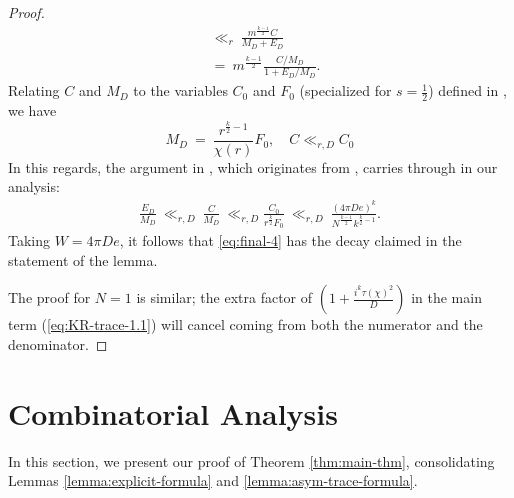\documentclass[12pt, reqno,oneside]{amsart}
\theoremstyle{plain}
\theoremstyle{definition}
\theoremstyle{remark}
\theoremstyle{plain}
\numberwithin{equation}{section}
\begin{document}
\begin{proof}
\begin{align}
\nonumber
&\ll_r \ \frac{m^{\frac{k-1}{2}}C}{M_D+E_D}\\
\label{eq:final-4}
&= \ m^{\frac{k-1}{2}}\frac{C/M_D}{1+E_D/M_D}.
\end{align}
Relating $C$ and $M_D$ to the variables $C_0$ and $F_0$ (specialized for $s=\frac{1}{2}$) defined in \cite[160-161]{KR18}, we have
\begin{equation}
M_D \ = \ \frac{r^{\frac{k}{2}-1}}{\chi(r)}F_0, \quad C \ll_{r,D} C_0
\end{equation}
In this regards, the argument 
in \cite[161]{KR18}, which originates from \cite[Section 9]{JK15}, carries through in our analysis:
\begin{align}\label{eq:semifinal-4}
\frac{E_D}{M_D} \ \ll_{r,D} \ \frac{C}{M_D} \ \ll_{r,D} \frac{C_0}{r^{\frac{k}{2}}F_0} \ \ll_{r,D} \ \frac{(4\pi De)^k}{N^{\frac{k-1}{2}}k^{\frac{k}{2}-1}}.
\end{align}
Taking $W = 4 \pi D e$, it follows that \eqref{eq:final-4} has the decay claimed in the statement of the lemma.

The proof for $N=1$ is similar; the extra factor of $\left(1+\frac{i^k\tau(\chi)^2}{D}\right)$ in the main term (\ref{eq:KR-trace-1.1}) will cancel coming from both the numerator and the denominator. 
\end{proof}

%
%

\section{Combinatorial Analysis}\label{sec:5}

In this section, we present our proof of Theorem \ref{thm:main-thm}, consolidating Lemmas \ref{lemma:explicit-formula} and \ref{lemma:asym-trace-formula}. 
\end{document}
